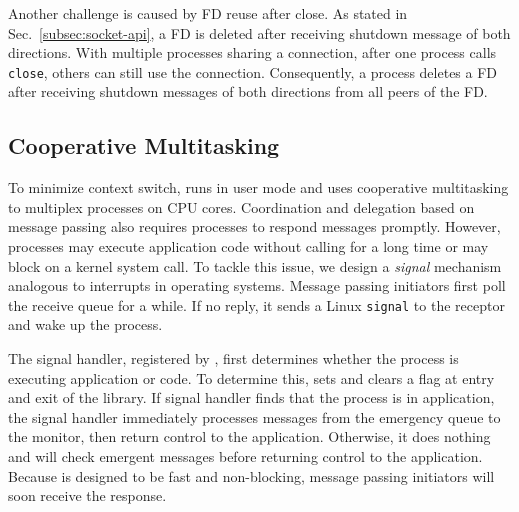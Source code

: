 Another challenge is caused by FD reuse after close. As stated in Sec.~\ref{subsec:socket-api}, a FD is deleted after receiving shutdown message of both directions. With multiple processes sharing a connection, after one process calls \texttt{close}, others can still use the connection. Consequently, a process deletes a FD after receiving shutdown messages of both directions from all peers of the FD.




\subsection{Cooperative Multitasking}
\label{subsec:process-mux}

To minimize context switch, \sys{} runs in user mode and uses cooperative multitasking to multiplex processes on CPU cores. Coordination and delegation based on message passing also requires processes to respond messages promptly. However, processes may execute application code without calling \libipc{} for a long time or may block on a kernel system call. To tackle this issue, we design a \textit{signal} mechanism analogous to interrupts in operating systems. Message passing initiators first poll the receive queue for a while. If no reply, it sends a Linux \texttt{signal} to the receptor and wake up the process.

The signal handler, registered by \libipc{}, first determines whether the process is executing application or \libipc{} code. To determine this, \libipc{} sets and clears a flag at entry and exit of the library. If signal handler finds that the process is in application, the signal handler immediately processes messages from the emergency queue to the monitor, then return control to the application. Otherwise, it does nothing and \libipc{} will check emergent messages before returning control to the application. Because \libipc{} is designed to be fast and non-blocking, message passing initiators will soon receive the response.

